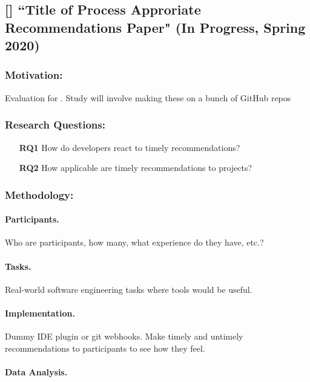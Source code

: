 \subsection{[\proc] ``Title of Process Approriate Recommendations Paper" (In Progress, Spring 2020)}

\subsubsection{Motivation:} Evaluation for \TOOL. Study will involve making these on a bunch of GitHub repos

\subsubsection{Research Questions:}

\begin{itemize}
    \item[\textbf{RQ1}] How do developers react to timely recommendations?
    \item[\textbf{RQ2}] How applicable are timely recommendations to projects?
\end{itemize}

\subsubsection{Methodology:}

\paragraph{Participants.}

Who are participants, how many, what experience do they have, etc.?

\paragraph{Tasks.}

Real-world software engineering tasks where tools would be useful.

\paragraph{Implementation.}

Dummy IDE plugin or git webhooks. Make timely and untimely recommendations to participants to see how they feel.

\paragraph{Data Analysis.}

